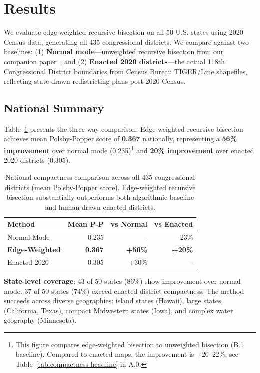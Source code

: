 \section{Results}

We evaluate edge-weighted recursive bisection on all 50 U.S. states using 2020 Census data, generating all 435 congressional districts. We compare against two baselines: (1) \textbf{Normal mode}—unweighted recursive bisection from our companion paper~\cite{dellaLibera2026recursive}, and (2) \textbf{Enacted 2020 districts}—the actual 118th Congressional District boundaries from Census Bureau TIGER/Line shapefiles, reflecting state-drawn redistricting plans post-2020 Census.

\subsection{National Summary}

Table~\ref{tab:national-summary} presents the three-way comparison. Edge-weighted recursive bisection achieves mean Polsby-Popper score of \textbf{0.367} nationally, representing a \textbf{56\% improvement} over normal mode (0.235)\footnote{This figure compares edge-weighted bisection to unweighted bisection (B.1 baseline). Compared to enacted maps, the improvement is $+20$--$22\%$; see Table~\ref{tab:compactness-headline} in A.0.} and \textbf{20\% improvement} over enacted 2020 districts (0.305).

\begin{table}[h]
\centering
\begin{tabular}{lrrr}
\toprule
\textbf{Method} & \textbf{Mean P-P} & \textbf{vs Normal} & \textbf{vs Enacted} \\
\midrule
Normal Mode & 0.235 & -- & -23\% \\
\textbf{Edge-Weighted} & \textbf{0.367} & \textbf{+56\%} & \textbf{+20\%} \\
Enacted 2020 & 0.305 & +30\% & -- \\
\bottomrule
\end{tabular}
\caption{National compactness comparison across all 435 congressional districts (mean Polsby-Popper score). Edge-weighted recursive bisection substantially outperforms both algorithmic baseline and human-drawn enacted districts.}
\label{tab:national-summary}
\end{table}

\textbf{State-level coverage}: 43 of 50 states (86\%) show improvement over normal mode. 37 of 50 states (74\%) exceed enacted district compactness. The method succeeds across diverse geographies: island states (Hawaii), large states (California, Texas), compact Midwestern states (Iowa), and complex water geography (Minnesota).

